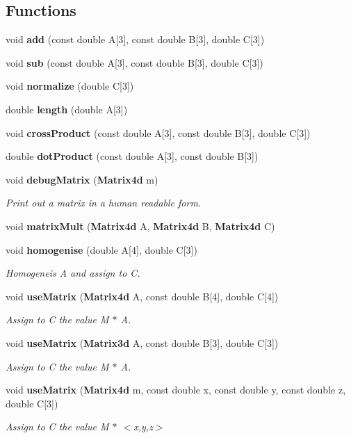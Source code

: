 \subsection*{Functions}
\begin{DoxyCompactItemize}
\item 
void {\bf add} (const double A[3], const double B[3], double C[3])
\item 
void {\bf sub} (const double A[3], const double B[3], double C[3])
\item 
void {\bf normalize} (double C[3])
\item 
double {\bf length} (double A[3])
\item 
void {\bf cross\+Product} (const double A[3], const double B[3], double C[3])
\item 
double {\bf dot\+Product} (const double A[3], const double B[3])
\item 
void {\bf debug\+Matrix} ({\bf Matrix4d} m)
\begin{DoxyCompactList}\small\item\em Print out a matrix in a human readable form. \end{DoxyCompactList}\item 
void {\bf matrix\+Mult} ({\bf Matrix4d} A, {\bf Matrix4d} B, {\bf Matrix4d} C)
\item 
void {\bf homogenise} (double A[4], double C[3])
\begin{DoxyCompactList}\small\item\em Homogeneis A and assign to C. \end{DoxyCompactList}\item 
void {\bf use\+Matrix} ({\bf Matrix4d} A, const double B[4], double C[4])
\begin{DoxyCompactList}\small\item\em Assign to C the value M $\ast$ A. \end{DoxyCompactList}\item 
void {\bf use\+Matrix} ({\bf Matrix3d} A, const double B[3], double C[3])
\begin{DoxyCompactList}\small\item\em Assign to C the value M $\ast$ A. \end{DoxyCompactList}\item 
void {\bf use\+Matrix} ({\bf Matrix4d} m, const double x, const double y, const double z, double C[3])
\begin{DoxyCompactList}\small\item\em Assign to C the value M $\ast$ $<$x,y,z$>$ \end{DoxyCompactList}\item 

\end{DoxyCompactItemize}
